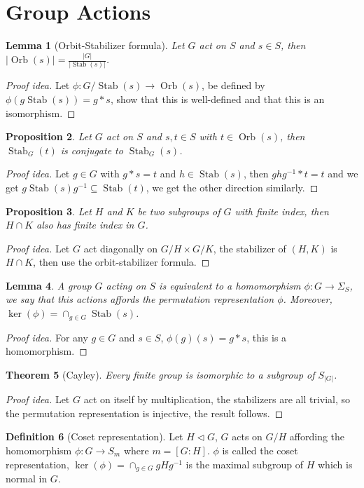 \documentclass[paper=a4, fontsize=12pt]{scrartcl} %
\newtheorem{thm}{Theorem}[section]
\newtheorem{prop}[thm]{Proposition}
\newtheorem{lem}[thm]{Lemma}
\theoremstyle{definition}
\newtheorem{defn}[thm]{Definition}
\theoremstyle{remark}
\DeclareMathOperator{\orb}{Orb}
\DeclareMathOperator{\stab}{Stab}
\numberwithin{equation}{section} %
\numberwithin{figure}{section} %
\numberwithin{table}{section} %
\begin{document}
\section{Group Actions}
\begin{lem}[Orbit-Stabilizer formula]
	Let $G$ act on $S$ and $s \in S$, then $|\orb(s)| = \frac{|G|}{|\stab(s)|}$.
\end{lem}
\begin{proof}[Proof idea]
	Let $\phi : G/\stab(s) \rightarrow \orb(s)$, be defined by $\phi(g\stab(s)) = g * s$, show that this is well-defined and that this is an isomorphism.
\end{proof}
\begin{prop}
	Let $G$ act on $S$ and $s, t \in S$ with $t \in \orb(s)$, then $\stab_G(t)$ is conjugate to $\stab_G(s)$.
\end{prop}
\begin{proof}[Proof idea]
	Let $g \in G$ with $g*s = t$ and $h \in \stab(s)$, then $ghg^{-1}*t = t$ and we get $g\stab(s)g^{-1} \subseteq \stab(t)$, we get the other direction similarly. 
\end{proof}
\begin{prop}
	Let $H$ and $K$ be two subgroups of $G$ with finite index, then $H \cap K$ also has finite index in $G$.
\end{prop}
\begin{proof}[Proof idea]
	Let $G$ act diagonally on $G/H \times G/K$, the stabilizer of $(H,K)$ is $H \cap K$, then use the orbit-stabilizer formula.
\end{proof}
\begin{lem}
	A group $G$ acting on $S$ is equivalent to a homomorphism $\phi: G \rightarrow \Sigma_S$, we say that this actions affords the permutation representation $\phi$. Moreover, $\ker(\phi) =\cap_{g\in G} \stab(s)$.
\end{lem}
\begin{proof}[Proof idea]
	For any $g \in G$ and $s \in S$, $\phi(g)(s) = g*s$, this is a homomorphism.
\end{proof}
\begin{thm}[Cayley]
	Every finite group is isomorphic to a subgroup of $S_{|G|}$.
\end{thm}
\begin{proof}[Proof idea]
	Let $G$ act on itself by multiplication, the stabilizers are all trivial, so the permutation representation is injective, the result follows.
\end{proof}
\begin{defn}[Coset representation]
 	Let $H \lhd G$, $G$ acts on $G/H$ affording the homomorphism $\phi : G\rightarrow S_m$ where $m = [G:H]$. $\phi$ is called the coset representation, $\ker(\phi) = \cap_{g\in G}gHg^{-1}$ is the maximal subgroup of $H$ which is normal in $G$.
\end{defn}
\end{document}
